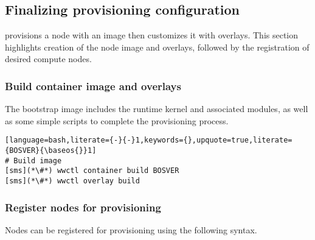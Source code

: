 \subsection{Finalizing provisioning configuration} \label{sec:assemble_bootstrap}

\Warewulf{} provisions a node with an image then customizes it with overlays. 
This section highlights creation of the node image and overlays, followed by the 
registration of desired compute nodes.

\subsubsection{Build container image and overlays}

The bootstrap image includes the runtime kernel and associated modules, as well
as some simple scripts to complete the provisioning process.

\begin{lstlisting}[language=bash,literate={-}{-}1,keywords={},upquote=true,literate={BOSVER}{\baseos{}}1]
# Build image
[sms](*\#*) wwctl container build BOSVER
[sms](*\#*) wwctl overlay build
\end{lstlisting}

\subsubsection{Register nodes for provisioning}

Nodes can be registered for provisioning using the following syntax.

